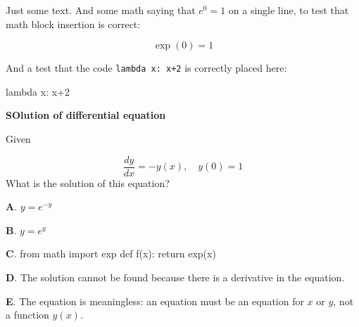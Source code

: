 \documentclass[%
oneside,                 %
final,                   %
10pt]{article}
\newenvironment{doconcequiz}{}{}
\newcounter{doconcequizcounter}
\newenvironment{doconceexercise}{}{}
\newcounter{doconceexercisecounter}
\theoremstyle{definition}
\begin{document}
\begin{enumerate}
\begin{doconceexercise}
\end{doconceexercise}

\begin{doconceexercise}



Just some text. And some math saying that $e^0=1$ on a single line,
to test that math block insertion is correct:

\[ \exp{(0)} = 1 \]

And a test that the code \texttt{lambda x: x+2} is correctly placed here:



\bccq
lambda x: x+2

\eccq


\end{doconceexercise}

\begin{doconceexercise}

                             
\label{sec:this:exer:de}


\begin{doconcequiz}
\label{quiz:diff:eq1}


\noindent\textbf{\large SOlution of differential equation}

\noindent
Given

\[ \frac{dy}{dx} = -y(x),\quad y(0)=1 \]
What is the solution of this equation?

\vspace{2mm}

\textbf{A}. 
$y=e^{-y}$

\textbf{B}. 
$y=e^{y}$

\textbf{C}. 
\bpycod
from math import exp
def f(x):
    return exp(x)

\epycod

\textbf{D}. 
The solution cannot be found because there is a derivative in the equation.

\textbf{E}. 
The equation is meaningless: an equation must be an equation
for $x$ or $y$, not a function $y(x)$.



\end{doconcequiz}
\end{doconceexercise}
\end{enumerate}
\end{document}

